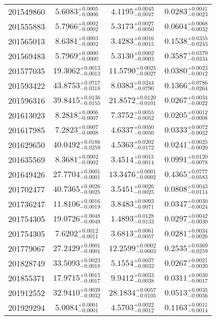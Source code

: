 \begin{tabular}{cccc}
201549860 & $5.6083_{-0.0006}^{+0.0005}$ & $4.1195_{-0.0047}^{+0.0045}$ & $0.0283_{-0.0023}^{+0.0041}$ \\
201555883 & $5.7966_{-0.0002}^{+0.0002}$ & $5.3173_{-0.0050}^{+0.0027}$ & $0.0604_{-0.0032}^{+0.0068}$ \\
201565013 & $8.6381_{-0.0002}^{+0.0003}$ & $3.4283_{-0.0015}^{+0.0016}$ & $0.1538_{-0.0243}^{+0.0355}$ \\
201569483 & $5.7969_{-0.0000}^{+0.0000}$ & $5.3130_{-0.0003}^{+0.0002}$ & $0.3587_{-0.0334}^{+0.0379}$ \\
201577035 & $19.3062_{-0.0013}^{+0.0013}$ & $11.5790_{-0.0027}^{+0.0025}$ & $0.0380_{-0.0012}^{+0.0023}$ \\
201593422 & $43.8753_{-0.0318}^{+0.0717}$ & $8.0383_{-0.0790}^{+0.0244}$ & $0.1366_{-0.0264}^{+0.0786}$ \\
201596316 & $39.8415_{-0.0155}^{+0.0136}$ & $21.8572_{-0.0101}^{+0.0120}$ & $0.0267_{-0.0022}^{+0.0034}$ \\
201613023 & $8.2818_{-0.0007}^{+0.0006}$ & $7.3752_{-0.0052}^{+0.0055}$ & $0.0205_{-0.0008}^{+0.0012}$ \\
201617985 & $7.2823_{-0.0008}^{+0.0007}$ & $4.6337_{-0.0050}^{+0.0050}$ & $0.0333_{-0.0032}^{+0.0072}$ \\
201629650 & $40.0492_{-0.0259}^{+0.0186}$ & $4.5363_{-0.0172}^{+0.0202}$ & $0.0241_{-0.0020}^{+0.0025}$ \\
201635569 & $8.3681_{-0.0002}^{+0.0002}$ & $3.4514_{-0.0014}^{+0.0015}$ & $0.0991_{-0.0078}^{+0.0120}$ \\
201649426 & $27.7704_{-0.0001}^{+0.0001}$ & $13.3476_{-0.0002}^{+0.0001}$ & $0.4365_{-0.0583}^{+0.0777}$ \\
201702477 & $40.7365_{-0.0025}^{+0.0026}$ & $3.5451_{-0.0025}^{+0.0026}$ & $0.0808_{-0.0114}^{+0.0043}$ \\
201736247 & $11.8106_{-0.0019}^{+0.0016}$ & $3.8483_{-0.0071}^{+0.0093}$ & $0.0347_{-0.0024}^{+0.0030}$ \\
201754305 & $19.0726_{-0.0049}^{+0.0048}$ & $1.4893_{-0.0133}^{+0.0128}$ & $0.0297_{-0.0030}^{+0.0042}$ \\
201754305 & $7.6202_{-0.0011}^{+0.0012}$ & $3.6813_{-0.0057}^{+0.0061}$ & $0.0281_{-0.0026}^{+0.0034}$ \\
201779067 & $27.2429_{-0.0001}^{+0.0001}$ & $12.2599_{-0.0003}^{+0.0002}$ & $0.2535_{-0.0259}^{+0.0369}$ \\
201828749 & $33.5093_{-0.0018}^{+0.0023}$ & $5.1554_{-0.0032}^{+0.0037}$ & $0.0267_{-0.0020}^{+0.0021}$ \\
201855371 & $17.9715_{-0.0017}^{+0.0015}$ & $9.9412_{-0.0038}^{+0.0033}$ & $0.0311_{-0.0017}^{+0.0030}$ \\
201912552 & $32.9410_{-0.0032}^{+0.0039}$ & $28.1834_{-0.0105}^{+0.0057}$ & $0.0513_{-0.0056}^{+0.0035}$ \\
201929294 & $5.0084_{-0.0001}^{+0.0001}$ & $4.5703_{-0.0012}^{+0.0022}$ & $0.1163_{-0.0014}^{+0.0011}$ \\
\bottomrule
\end{tabular}
